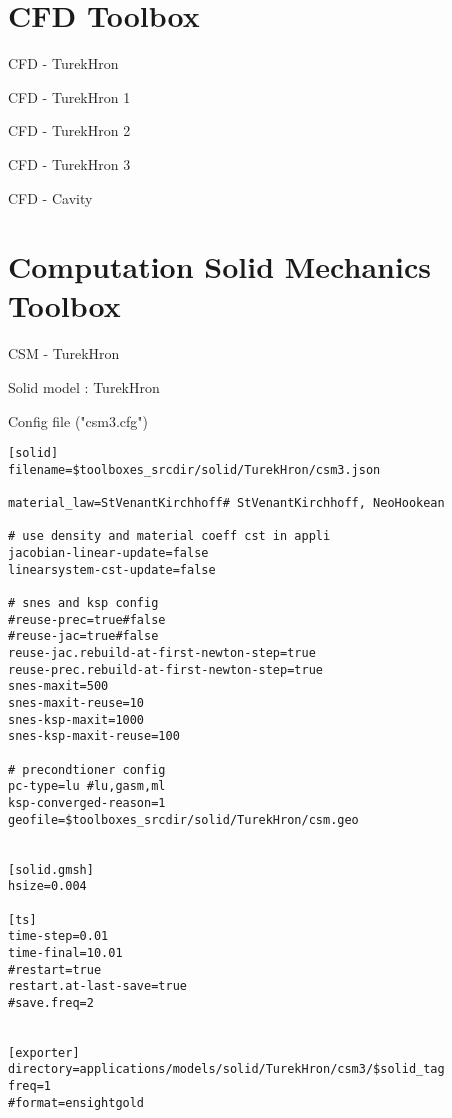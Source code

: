 \section[CFD]{CFD Toolbox}
\begin{frame}[fragile]{CFD - TurekHron}
\end{frame}

\begin{frame}[fragile]{CFD - TurekHron 1}
\end{frame}

\begin{frame}[fragile]{CFD - TurekHron 2}
\end{frame}

\begin{frame}[fragile]{CFD - TurekHron 3}
\end{frame}


\begin{frame}[fragile]{CFD - Cavity}
\end{frame}


\section[CSM]{Computation Solid Mechanics Toolbox}
\begin{frame}[fragile]{CSM - TurekHron}

Solid model : TurekHron

Config file ("csm3.cfg")
\begin{lstlisting}
[solid]
filename=$toolboxes_srcdir/solid/TurekHron/csm3.json

material_law=StVenantKirchhoff# StVenantKirchhoff, NeoHookean

# use density and material coeff cst in appli
jacobian-linear-update=false
linearsystem-cst-update=false

# snes and ksp config
#reuse-prec=true#false
#reuse-jac=true#false
reuse-jac.rebuild-at-first-newton-step=true
reuse-prec.rebuild-at-first-newton-step=true
snes-maxit=500
snes-maxit-reuse=10
snes-ksp-maxit=1000
snes-ksp-maxit-reuse=100

# precondtioner config
pc-type=lu #lu,gasm,ml
ksp-converged-reason=1
geofile=$toolboxes_srcdir/solid/TurekHron/csm.geo


[solid.gmsh]
hsize=0.004

[ts]
time-step=0.01
time-final=10.01
#restart=true
restart.at-last-save=true
#save.freq=2


[exporter]
directory=applications/models/solid/TurekHron/csm3/$solid_tag
freq=1
#format=ensightgold
\end{lstlisting}
\end{frame}


